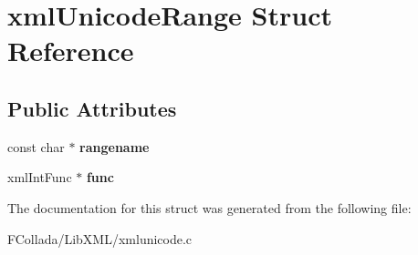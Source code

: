 \hypertarget{structxmlUnicodeRange}{
\section{xmlUnicodeRange Struct Reference}
\label{structxmlUnicodeRange}
}
\subsection*{Public Attributes}
\begin{DoxyCompactItemize}
\item 
\hypertarget{structxmlUnicodeRange_a397da4c806c7d0b5eb3c1bf17a489f94}{
const char $\ast$ {\bfseries rangename}}
\label{structxmlUnicodeRange_a397da4c806c7d0b5eb3c1bf17a489f94}

\item 
\hypertarget{structxmlUnicodeRange_a63494e9178ec4f54c8bb77a171dfe25f}{
xmlIntFunc $\ast$ {\bfseries func}}
\label{structxmlUnicodeRange_a63494e9178ec4f54c8bb77a171dfe25f}

\end{DoxyCompactItemize}


The documentation for this struct was generated from the following file:\begin{DoxyCompactItemize}
\item 
FCollada/LibXML/xmlunicode.c\end{DoxyCompactItemize}

